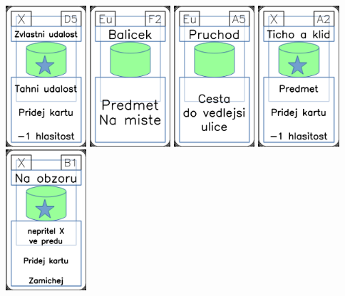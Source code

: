 \documentclass[a4paper]{article}
\begin{document}
	\includegraphics[width=3.0cm]{img-5_19}
	\includegraphics[width=3.0cm]{img-4_26}
	\includegraphics[width=3.0cm]{img-4_34}
	\includegraphics[width=3.0cm]{img-5_1}
	\includegraphics[width=3.0cm]{img-5_5}
\end{document}
